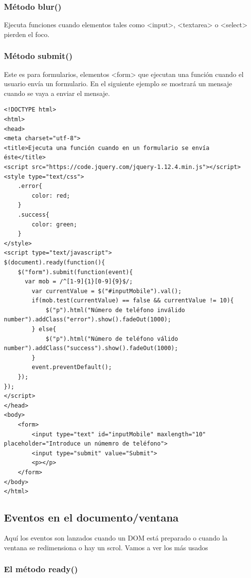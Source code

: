 \documentclass[11pt]{article}
\begin{document}
\subsubsection*{Método blur()}
\label{sec:orgc69fe48}

Ejecuta funciones cuando elementos tales como <input>, <textarea> o <select> pierden el foco.

\subsubsection*{Método submit()}
\label{sec:orgb95650c}
Este es para formularios, elementos <form> que ejecutan una función cuando el usuario envía un formulario. En el siguiente ejemplo se mostrará un mensaje cuando se vaya a enviar el mensaje.


\begin{verbatim}
<!DOCTYPE html>
<html>
<head>
<meta charset="utf-8">
<title>Ejecuta una función cuando en un formulario se envía éste</title>
<script src="https://code.jquery.com/jquery-1.12.4.min.js"></script>
<style type="text/css">
    .error{
        color: red;
    }
    .success{
        color: green;
    }
</style>
<script type="text/javascript">
$(document).ready(function(){
    $("form").submit(function(event){
      var mob = /^[1-9]{1}[0-9]{9}$/;
        var currentValue = $("#inputMobile").val();
        if(mob.test(currentValue) == false && currentValue != 10){
            $("p").html("Número de teléfono inválido number").addClass("error").show().fadeOut(1000);
        } else{
            $("p").html("Número de teléfono válido number").addClass("success").show().fadeOut(1000);
        }
        event.preventDefault();
    });
});
</script>
</head>
<body>
    <form>
        <input type="text" id="inputMobile" maxlength="10" placeholder="Introduce un númemro de teléfono">
        <input type="submit" value="Submit">
        <p></p>
    </form>
</body>
</html>                                		
\end{verbatim}

\subsection*{Eventos en el documento/ventana}
\label{sec:org0984e3a}

Aquí los eventos son lanzados cuando un DOM está preparado o cuando la ventana se redimensiona o hay un scrol. Vamos a ver los más usados

\subsubsection*{El método ready()}
\label{sec:org71b48e2}
\end{document}
